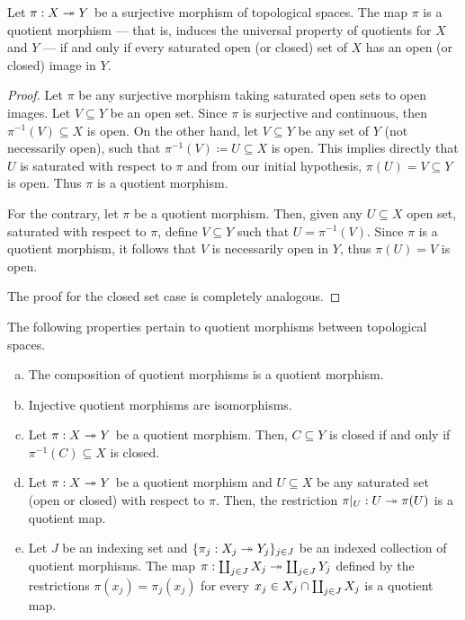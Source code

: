\begin{proposition}
    \label{prop:surjective-saturated-is-quotient}
    Let \(\pi: X \twoheadrightarrow Y\) be a surjective morphism of topological spaces. The map
    \(\pi\) is a quotient morphism --- that is, induces the universal property of
    quotients for \(X\) and \(Y\) --- if and only if every saturated open (or
    closed) set of \(X\) has an open (or closed) image in \(Y\).
\end{proposition}

\begin{proof}
    Let \(\pi\) be any surjective morphism taking saturated open sets to open
    images. Let \(V \subseteq Y\) be an open set. Since \(\pi\) is surjective and
    continuous, then \(\pi^{-1}(V) \subseteq X\) is open. On the other hand, let \(V
    \subseteq Y\) be any set of \(Y\) (not necessarily open), such that
    \(\pi^{-1}(V) \coloneq U \subseteq X\) is open. This implies directly that \(U\)
    is saturated with respect to \(\pi\) and from our initial hypothesis, \(\pi(U) =
    V \subseteq Y\) is open. Thus \(\pi\) is a quotient morphism.

    For the contrary, let \(\pi\) be a quotient morphism. Then, given any \(U
    \subseteq X\) open set, saturated with respect to \(\pi\), define \(V \subseteq
    Y\) such that \(U = \pi^{-1}(V)\). Since \(\pi\) is a quotient morphism, it
    follows that \(V\) is necessarily open in \(Y\), thus \(\pi(U) = V\) is open.

    The proof for the closed set case is completely analogous.
\end{proof}

\begin{proposition}
    \label{prop:properties-quotient-morphism}
    The following properties pertain to quotient morphisms between topological
    spaces.
    \begin{enumerate}[(a)]\setlength\itemsep{0em}
        \item The composition of quotient morphisms is a quotient morphism.
        \item Injective quotient morphisms are isomorphisms.
        \item Let \(\pi: X \twoheadrightarrow Y\) be a quotient morphism. Then, \(C \subseteq Y\) is
              closed if and only if \(\pi^{-1}(C) \subseteq X\) is closed.
        \item Let \(\pi: X \twoheadrightarrow Y\) be a quotient morphism and \(U \subseteq X\) be any
              saturated set (open or closed) with respect to \(\pi\). Then, the restriction
              \(\pi|_U: U \twoheadrightarrow \pi(U)\) is a quotient map.
        \item Let \(J\) be an indexing set and \(\{\pi_j: X_j \twoheadrightarrow Y_j\}_{j \in J}\) be
              an indexed collection of quotient morphisms. The map \(\pi: \coprod_{j \in J}
              X_j \twoheadrightarrow \coprod_{j \in J} Y_j\) defined by the restrictions \(\pi(x_{j}) =
              \pi_{j}(x_j)\) for every \(x_j \in X_{j} \cap \coprod_{j \in J} X_j\) is a
              quotient map.
    \end{enumerate}
\end{proposition}

